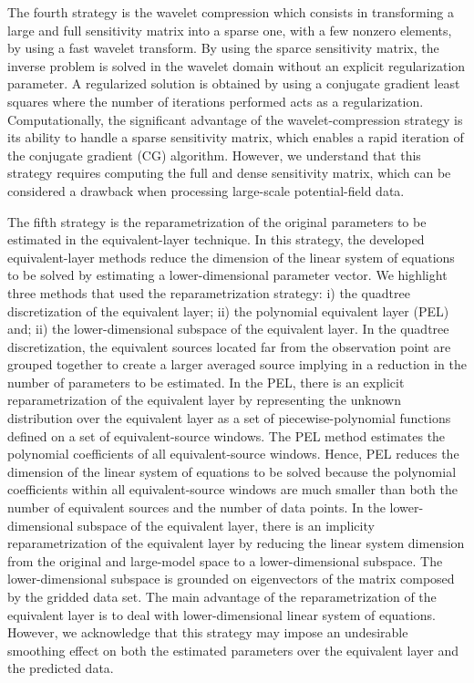 The fourth strategy is the wavelet compression which consists in transforming 
a large and full sensitivity matrix into a sparse one, with a few nonzero elements, by using a fast wavelet transform.
By using the sparce sensitivity matrix, the inverse problem is solved in the wavelet domain without an explicit regularization parameter.
A regularized solution is obtained  by using a conjugate gradient least squares where the number of iterations performed acts as a regularization.
Computationally, the significant advantage of the wavelet-compression strategy is its ability to handle a sparse sensitivity matrix, which enables a rapid iteration of the conjugate gradient (CG) algorithm.
However, we understand that this strategy requires computing the full and dense sensitivity matrix, which can be considered a drawback when processing large-scale potential-field data.


The fifth strategy is the reparametrization of the original parameters to be estimated in the equivalent-layer technique.
In this strategy, the developed equivalent-layer methods reduce 
the dimension of the linear system of equations to be solved by 
estimating a lower-dimensional parameter vector.
We highlight three methods that used the reparametrization strategy:
i)  the quadtree discretization of the equivalent layer;
ii) the polynomial equivalent layer (PEL) and; 
ii) the lower-dimensional subspace of the equivalent layer.
In the quadtree discretization, the equivalent sources located far from the observation point are grouped together to create a larger averaged source
implying in a reduction in the number of parameters to be estimated.
In the PEL, there  is an explicit reparametrization of the equivalent layer
by representing the unknown distribution over the equivalent layer as a set of 
piecewise-polynomial functions defined on a set of equivalent-source windows.
The PEL method estimates the polynomial coefficients of all equivalent-source windows.
Hence, PEL reduces the dimension of the linear system of equations to be solved because the polynomial coefficients within all equivalent-source windows 
are much smaller than both the number of equivalent sources and the number of data points.
In the lower-dimensional subspace of the equivalent layer, there  is an implicity  reparametrization of the equivalent layer by reducing the linear system dimension from the original and large-model space 
to a lower-dimensional subspace.
The lower-dimensional subspace is grounded on eigenvectors of the matrix composed by the gridded data set.
The main advantage of the reparametrization of the equivalent layer is to deal with lower-dimensional  linear system of equations.
However, we acknowledge that this strategy may impose an undesirable smoothing effect on both the estimated parameters over the equivalent layer and the predicted data.


